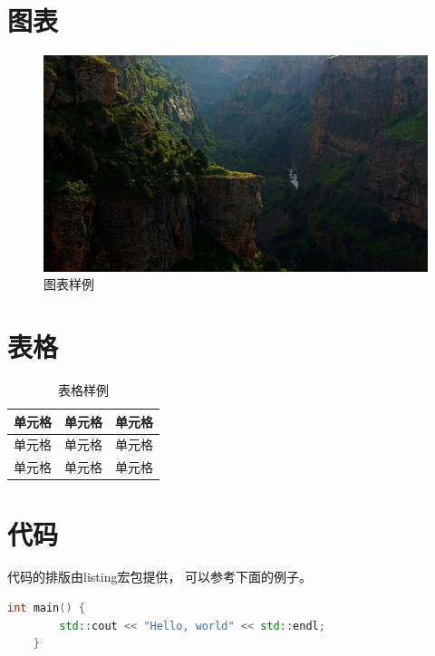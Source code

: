 \documentclass{note}
\begin{document}
\section{图表}
\begin{figure}[h]
    \centering
    \includegraphics[width=0.8\linewidth]{graph-sample.jpg}
    \caption{图表样例}
\end{figure}


\section{表格}
\begin{table}[h]
    \centering
    \caption{表格样例}
    \begin{tabular}[c]{ccc}
        \toprule
        单元格 & 单元格 & 单元格 \\ \midrule
        单元格 & 单元格 & 单元格 \\
        单元格 & 单元格 & 单元格 \\
        \bottomrule
    \end{tabular}
\end{table}


\section{代码}
代码的排版由listing宏包提供， 可以参考下面的例子。

\begin{texcodesample}
\begin{lstlisting}[language=C++]
    int main() {
        std::cout << "Hello, world" << std::endl;
    }
\end{lstlisting}
\end{texcodesample}
\end{document}
